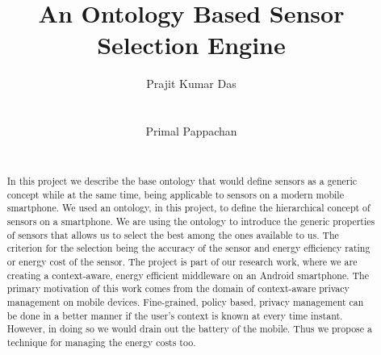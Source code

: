 \documentclass{ubicomp2013}
\begin{document}


\title{An Ontology Based Sensor Selection Engine}
\author{
  \alignauthor Prajit Kumar Das\\
    \\
      \\
   \alignauthor Primal Pappachan\\
    \\
     }
\maketitle

\begin{abstract}

In this project we describe the base ontology that would define sensors as a generic concept while at the same time, being applicable to sensors on a modern mobile smartphone. We used an ontology, in this project, to define the hierarchical concept of sensors on a smartphone. We are using the ontology to introduce the generic properties of sensors that allows us to select the best among the ones available to us. The criterion for the selection being the accuracy of the sensor and energy efficiency rating or energy cost of the sensor. The project is part of our research work, where we are creating a context-aware, energy efficient middleware on an Android smartphone. The primary motivation of this work comes from the domain of context-aware privacy management on mobile devices. Fine-grained, policy based, privacy management can be done in a better manner if the user's context is known at every time instant. However, in doing so we would drain out the battery of the mobile. Thus we propose a technique for managing the energy costs too. 

\end{abstract}

\end{document}
